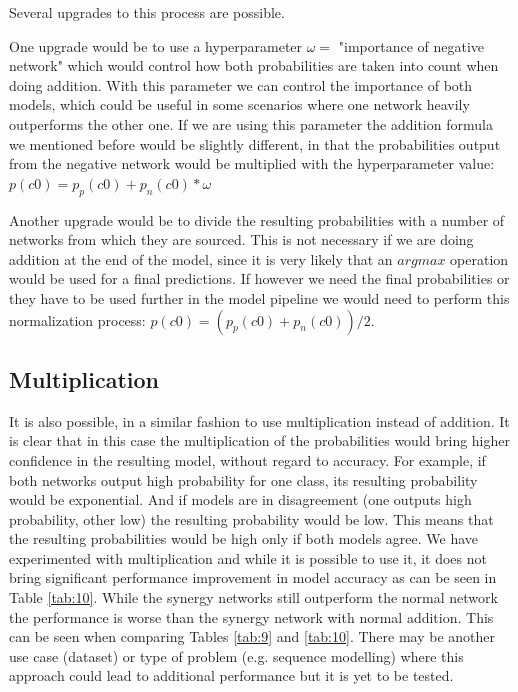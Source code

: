 \documentclass[b5paper]{book}
\begin{document}
Several upgrades to this process are possible.

One upgrade would be to use a hyperparameter \( \omega = \) "importance of negative network"  which would control how both probabilities are taken into count when doing addition. With this parameter we can control the importance of both models, which could be useful in some scenarios where one network heavily outperforms the other one. If we are using this parameter the addition formula we mentioned before would be slightly different, in that the probabilities output from the negative network would be multiplied with the hyperparameter value: \( p(c0) = p_p(c0) + p_n(c0) * \omega \)

Another upgrade would be to divide the resulting probabilities with a number of networks from which they are sourced. This is not necessary if we are doing addition at the end of the model, since it is very likely that an \( argmax \) operation would be used for a final predictions. If however we need the final probabilities or they have to be used further in the model pipeline we would need to perform this normalization process: \( p(c0) = (p_p(c0) + p_n(c0)) / 2 \).

\subsection{Multiplication}

It is also possible, in a similar fashion to use multiplication instead of addition. It is clear that in this case the multiplication of the probabilities would bring higher confidence in the resulting model, without regard to accuracy. For example, if both networks output high probability for one class, its resulting probability would be exponential. And if models are in disagreement (one outputs high probability, other low) the resulting probability would be low. This means that the resulting probabilities would be high only if both models agree. We have experimented with multiplication and while it is possible to use it, it does not bring significant performance improvement in model accuracy as can be seen in Table \ref{tab:10}. While the synergy networks still outperform the normal network the performance is worse than the synergy network with normal addition. This can be seen when comparing Tables \ref{tab:9} and \ref{tab:10}. There may be another use case (dataset) or type of problem (e.g. sequence modelling) where this approach could lead to additional performance but it is yet to be tested.
\end{document}

